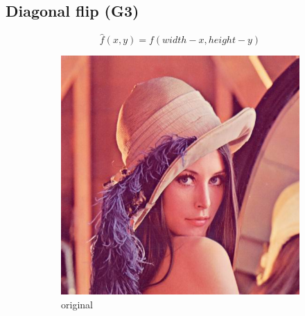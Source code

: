 \documentclass[12pt]{article}
\newcommand{\subfiguresize}{.3\textwidth}
\begin{document}
\subsection*{Diagonal flip (G3)}

\begin{equation}
    \hat{f}(x,y) = f(width - x, height - y)
\end{equation}

\begin{figure}[H]\centering
    \begin{subfigure}[t]{\subfiguresize}\centering
        \includegraphics[width=\textwidth]{lenac.png}
        \caption{original}
    \end{subfigure}
    \hspace{.05\textwidth}
    \begin{subfigure}[t]{\subfiguresize}\centering

\end{subfigure}
\end{figure}
\end{document}
